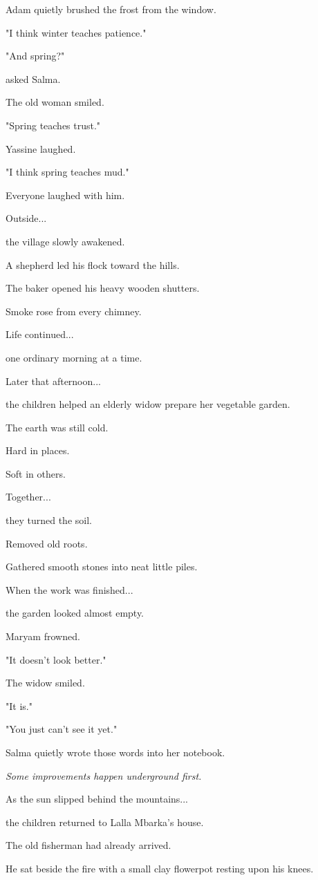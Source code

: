 \documentclass[12pt,openany]{book}
\begin{document}
Adam quietly brushed the frost from the window.

"I think winter teaches patience."

"And spring?"

asked Salma.

The old woman smiled.

"Spring teaches trust."

Yassine laughed.

"I think spring teaches mud."

Everyone laughed with him.

Outside...

the village slowly awakened.

A shepherd led his flock toward the hills.

The baker opened his heavy wooden shutters.

Smoke rose from every chimney.

Life continued...

one ordinary morning at a time.

Later that afternoon...

the children helped an elderly widow prepare her vegetable garden.

The earth was still cold.

Hard in places.

Soft in others.

Together...

they turned the soil.

Removed old roots.

Gathered smooth stones into neat little piles.

When the work was finished...

the garden looked almost empty.

Maryam frowned.

"It doesn't look better."

The widow smiled.

"It is."

"You just can't see it yet."

Salma quietly wrote those words into her notebook.

\emph{Some improvements happen underground first.}

As the sun slipped behind the mountains...

the children returned to Lalla Mbarka's house.

The old fisherman had already arrived.

He sat beside the fire with a small clay flowerpot resting upon his knees.
\end{document}

